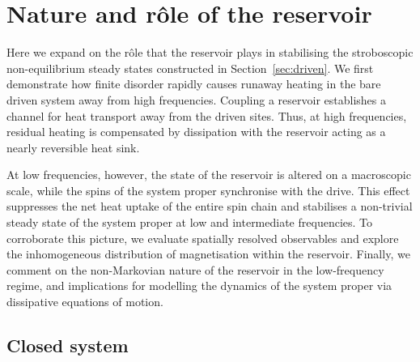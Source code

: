\documentclass[aps,pre,twocolumn,notitlepage,floats,10pt]{revtex4-1}
\begin{document}
\section{Nature and r\^{o}le of the reservoir}\label{sec:reservoir}

Here we expand on the r\^{o}le that the reservoir plays in stabilising the
stroboscopic non-equilibrium steady states constructed in
Section~\ref{sec:driven}.
We first demonstrate how finite disorder rapidly causes runaway heating in the
bare driven system away from high frequencies.
Coupling a reservoir establishes a channel for heat transport away from the
driven sites.
Thus, at high frequencies, residual heating is compensated by dissipation with
the reservoir acting as a nearly reversible heat sink.

At low frequencies, however, the state of the reservoir is altered on a
macroscopic scale, while the spins of the system proper synchronise with the
drive.
This effect suppresses the net heat uptake of the entire spin chain and
stabilises a non-trivial steady state of the system proper at low and
intermediate frequencies.
To corroborate this picture, we evaluate spatially resolved observables and
explore the inhomogeneous distribution of magnetisation within the reservoir.
Finally, we comment on the non-Markovian nature of the reservoir in the
low-frequency regime, and implications for modelling the dynamics of the system
proper via dissipative equations of motion.

\subsection{Closed system} \label{sec:closed}
\end{document}
